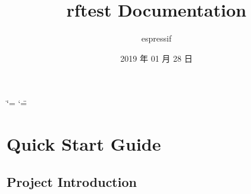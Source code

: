 \documentclass[letterpaper,10pt,english]{sphinxhowto}
\title{rftest Documentation}
\date{2019 年 01 月 28 日}
\author{espressif}
\begin{document}
\ifdefined\shorthandoff
  \ifnum\catcode`\=\string=\active\shorthandoff{=}\fi
  \ifnum\catcode`\"=\active{}\fi
\fi

\maketitle
\sphinxtableofcontents
{}\label{\detokenize{index::doc}}



\section{Quick Start Guide}
\label{\detokenize{quick_start/quick_start:quick-start-guide}}\label{\detokenize{quick_start/quick_start::doc}}

\subsection{Project Introduction}
\end{document}
